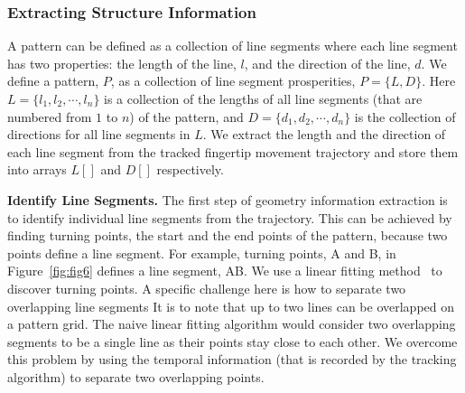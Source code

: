     \subsubsection{Extracting Structure Information}
        A pattern can be defined as a collection of line
        segments where each line segment has two properties:
        the length of the line, $l$, and the direction of the line, $d$.
        We define a
         pattern, $P$, as a collection of line segment prosperities,  $P=\{L, D\}$.
        Here $L=\{l_{1}, l_{2}, \cdots, l_{n}\}$ is a collection of the lengths
        of all line segments (that are numbered from $1$ to $n$) of the pattern, and $D=\{d_{1}, d_{2}, \cdots, d_{n}\}$ is the collection of directions for all line segments in $L$.
        We extract the length and the direction of each line segment from the tracked fingertip movement trajectory and store them
        into arrays $L[]$ and $D[]$ respectively.

        \noindent \textbf{Identify Line Segments.}
        The first step of geometry information extraction is to identify individual
        line segments from the trajectory. This can be achieved
        by finding turning points, the start and the end points of the pattern, because two points define a line segment. For example, turning points, A and B, in
        Figure~\ref{fig:fig6} defines a line segment, AB.
        We use a linear fitting
        method~\cite{Kutner2004Applied} to discover turning points. %
        A specific challenge here is how to separate two overlapping line segments
        It is to note that up to two lines can be overlapped on a pattern grid.
        The naive
        linear fitting algorithm would consider two overlapping segments to be a
        single line as their points stay close to each other. We overcome this problem
       by using the temporal information (that is recorded by the
        tracking algorithm) to separate two overlapping points.

